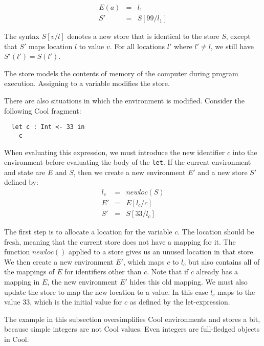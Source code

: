 \documentclass[]{article}
\begin{document}
\begin{displaymath}
\begin{array}{rcl}
E(a) & = & l_1 \\
S' & = & S[99/l_1]
\end{array}\end{displaymath}

The syntax $S[v/l]$ denotes a new store that is identical to the store
$S$, except that $S'$ maps location $l$ to value $ v$. For all locations
$l'$ where $l'\not=l$, we still have $S'(l')=S(l')$.

The store models the contents of memory of the computer during program
execution. Assigning to a variable modifies the store.

There are also situations in which the environment is modified. Consider
the following Cool fragment:

\begin{verbatim}
  let c : Int <- 33 in
    c
\end{verbatim}

When evaluating this expression, we must introduce the new identifier
$c$ into the environment before evaluating the body of the \texttt{let}.
If the current environment and state are $E$ and $S$, then we create a
new environment $E'$ and a new store $S'$ defined by: \\

\begin{displaymath}
\begin{array}{rcl}
l_c & = & newloc(S)\\
E' & = & E[l_c/c]\\
S' & = & S[33/l_c]
\end{array}\end{displaymath}

The first step is to allocate a location for the variable $c$. The
location should be fresh, meaning that the current store does not have a
mapping for it. The function $newloc()$ applied to a store gives us an
unused location in that store. We then create a new environment $E'$,
which maps $c$ to $l_c$ but also contains all of the mappings of $E$ for
identifiers other than $c$. Note that if $c$ already has a mapping in
$E$, the new environment $E'$ hides this old mapping. We must also
update the store to map the new location to a value. In this case $l_c$
maps to the value $33$, which is the initial value for $c$ as defined by
the let-expression.

The example in this subsection oversimplifies Cool environments and
stores a bit, because simple integers are not Cool values. Even integers
are full-fledged objects in Cool.
\end{document}

